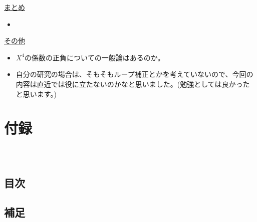 \documentclass[
  unicode,a4paper,9pt,
  xcolor = {dvipsnames,svgnames},
  hyperref ={colorlinks=true,citecolor=Navy,linkcolor=NavyBlue,urlcolor=purple},
  ja=standard,lualatex
]{beamer}
\begin{document}
\begin{frame}[plain]
  \huge \secname
\end{frame}


\begin{frame}

  \uline{まとめ}
  \begin{itemize}
    \item 
  \end{itemize}

  \uline{その他}
  \begin{itemize}
    \item 
    $X^4$の係数の正負についての一般論はあるのか。
    \item 
    自分の研究の場合は、そもそもループ補正とかを考えていないので、今回の内容は直近では役に立たないのかなと思いました。(勉強としては良かったと思います。)
  \end{itemize}

\end{frame}



\setcounter{Appendix}{\value{framenumber}}
\setcounter{section}{0}
\renewcommand{\thesubsection}{\Alph{subsection}}
\makeatletter
\renewcommand{\theequation}{\thesubsection.\arabic{equation}}

\renewcommand{\thefigure}{\thesubsection.\arabic{figure}}

\renewcommand{\thetable}{\thesubsection.\arabic{table}}
\makeatother

\section{付録}

\begin{frame}[plain]
  \frametitle{\ }
  \huge \secname
\end{frame}

\subsection{目次}

\begin{frame}{\subsecname}
  \tableofcontents
\end{frame}


\subsection{補足}
\end{document}
